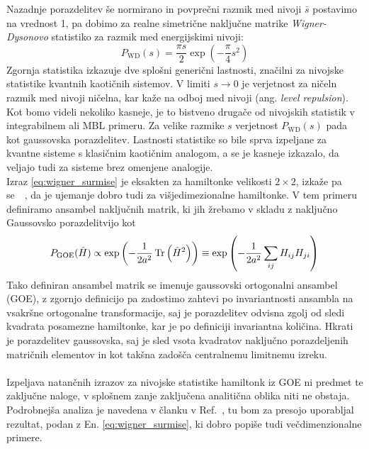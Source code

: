 \documentclass[10pt,a4paper]{article}
\begin{document}
 Nazadnje porazdelitev še normirano in povprečni razmik med nivoji $\bar{s}$ postavimo na vrednost 1, pa dobimo za realne simetrične naključne matrike \emph{Wigner-Dysonovo} statistiko za razmik med energijskimi nivoji: 
 \begin{equation}\label{eq:wigner-dyson}
 P_\mathrm{WD}(s)=\frac{\pi s}{2}\exp\left(-\frac{\pi}{4}s^2\right)
 \end{equation}
 Zgornja statistika izkazuje dve splošni generični lastnosti, značilni za nivojske statistike kvantnih kaotičnih sistemov. V limiti $s\to 0$ je verjetnost za ničeln razmik med nivoji ničelna, kar kaže na odboj med nivoji (ang. \emph{level repulsion}). Kot bomo videli nekoliko kasneje, je to bistveno drugače od nivojskih statistik v integrabilnem ali MBL primeru. Za velike razmike $s$ verjetnost $P_\mathrm{WD}(s)$ pada kot gaussovska porazdelitev. Lastnosti statistike so bile sprva izpeljane za kvantne sisteme s klasičnim kaotičnim analogom, a se je kasneje izkazalo, da veljajo tudi za sisteme brez omenjene analogije.\\


 Izraz \eqref{eq:wigner_surmise} je eksakten za hamiltonke velikosti $2\times2$, izkaže pa se~\cite{abanin2018ergodicity}~\cite{atas2013distribution}, da je ujemanje dobro tudi za višjedimezionalne hamiltonke. V tem primeru definiramo ansambel naključnih matrik, ki jih žrebamo v skladu z naključno Gaussovsko porazdelitvijo kot
 \begin{equation}
 P_\mathrm{GOE}(\hat{H})\propto \exp\left(-\frac{1}{2a^2}\mathop{\rm Tr}\left(\hat{H}^2\right) \right) \equiv \exp\left(-\frac{1}{2a^2}\sum\limits_{ij}H_{ij}H_{ji} \right)
 \end{equation}
 Tako definiran ansambel matrik se imenuje gaussovski ortogonalni ansambel (GOE), z zgornjo definicijo pa zadostimo zahtevi po invariantnosti ansambla na vsakršne ortogonalne transformacije, saj je porazdelitev odvisna zgolj od sledi kvadrata posamezne hamiltonke, kar je po definiciji invariantna količina. Hkrati je porazdelitev gaussovska, saj je sled vsota kvadratov naključno porazdeljenih matričnih elementov in kot takšna zadošča centralnemu limitnemu izreku. \\\\Izpeljava natančnih izrazov za nivojske statistike hamiltonk iz GOE ni predmet te zaključne naloge, v splošnem zanje zaključena analitična oblika niti ne obstaja. Podrobnejša analiza je navedena v članku v Ref.~\cite{atas2013distribution}, tu bom za presojo uporabljal rezultat, podan z En. \eqref{eq:wigner_surmise}, ki dobro popiše tudi večdimenzionalne primere. 
\end{document}
